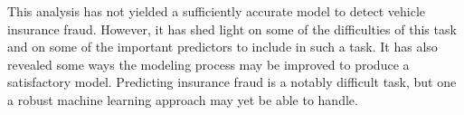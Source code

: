 \documentclass{article}
\begin{document}
This analysis has not yielded a sufficiently accurate model to detect vehicle insurance fraud. However, 
it has shed light on some of the difficulties of this task and on some of the important predictors to 
include in such a task.  It has also revealed some ways the modeling process may be improved to produce 
a satisfactory model.  Predicting insurance fraud is a notably difficult task, but one a robust machine 
learning approach may yet be able to handle.     
\end{document}
